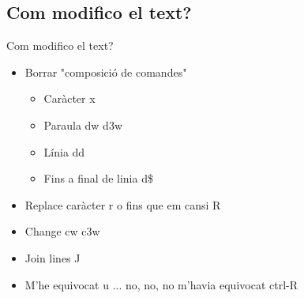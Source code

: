 \documentclass{beamer}
\begin{document}
    \subsection{Com modifico el text?}
    \begin{frame}{Com modifico el text?}
        \begin{itemize}
            \item Borrar
                \alert{"composició de comandes"}
                \begin{itemize}
                    \item Caràcter  \alert{x}
                    \item Paraula   \alert{dw d3w}
                    \item Línia   \alert{dd}
                    \item Fins a final de linia \alert{d\$}
                \end{itemize}
            \item Replace caràcter \alert{r} o fins que em cansi \alert{R}
            \item Change \alert{cw c3w}
            \item Join lines \alert{J}
            \item M'he equivocat \alert{u} ... no, no, no m'havia equivocat \alert{ctrl-R}
        \end{itemize}
    \end{frame}
\end{document}
